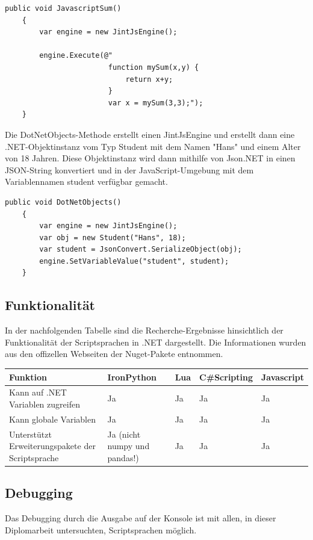 \begin{lstlisting}[language={[Sharp]C}, caption=JavascriptSum, label=lst:imp:jsSum]
    public void JavascriptSum()
    {
        var engine = new JintJsEngine();

        engine.Execute(@"
                        function mySum(x,y) {
                            return x+y;
                        }
                        var x = mySum(3,3);");
    }
\end{lstlisting}
Die DotNetObjects-Methode erstellt einen JintJsEngine und erstellt dann eine .NET-Objektinstanz vom Typ Student mit dem Namen "Hans" und einem Alter von 18 Jahren. Diese Objektinstanz wird dann mithilfe von Json.NET in einen JSON-String konvertiert und in der JavaScript-Umgebung mit dem Variablennamen student verfügbar gemacht.

\begin{lstlisting}[language={[Sharp]C}, caption=JavascriptObjects, label=lst:imp:jsObj]
    public void DotNetObjects()
    {
        var engine = new JintJsEngine();
        var obj = new Student("Hans", 18);
        var student = JsonConvert.SerializeObject(obj);
        engine.SetVariableValue("student", student);           
    }
\end{lstlisting}

\newpage
\subsection{Funktionalität}
In der nachfolgenden Tabelle sind die Recherche-Ergebnisse hinsichtlich der Funktionalität der Scriptsprachen in .NET dargestellt.
Die Informationen wurden aus den offizellen Webseiten der Nuget-Pakete entnommen.

\begin{table}[H]
    \begin{tabular}{|p{3cm}|p{3cm}|p{3cm}|p{3cm}|p{3cm}|}
        \hline
        Funktion & IronPython & Lua & C\#Scripting & Javascript\\ \hline
        Kann auf .NET Variablen zugreifen & Ja & Ja & Ja & Ja \\ \hline
        Kann globale Variablen & Ja & Ja & Ja & Ja \\ \hline
        Unterstützt Erweiterungspakete der Scriptsprache & Ja (nicht numpy und pandas!) & Ja & Ja & Ja \\ \hline 
    \end{tabular} 
\end{table}

\newpage
\subsection{Debugging}
Das Debugging durch die Ausgabe auf der Konsole ist mit allen, in dieser Diplomarbeit untersuchten, Scriptsprachen möglich.

